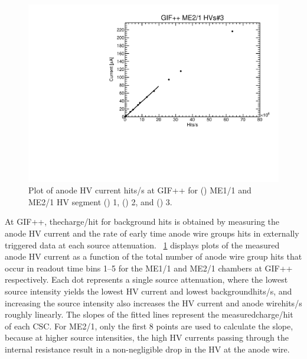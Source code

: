 \begin{figure}
	\includegraphics[width=\halfFigWidth]{figures/neutron/g_S3_C110.pdf}
	\caption{Plot of anode HV current \vs\unit{hits/s} at GIF++ for () ME1/1 and ME2/1 HV segment () 1, () 2, and () 3.}
	\label{fig:GIF_IvsH}
\end{figure}

At GIF++, the\unit{charge/hit} for background hits is obtained by measuring the anode HV current and the rate of early time anode wire groups hits in externally triggered data at each source attenuation. \Fig~\ref{fig:GIF_IvsH} displays plots of the measured anode HV current as a function of the total number of anode wire group hits that occur in readout time bins 1--5 for the ME1/1 and ME2/1 chambers at GIF++ respectively. Each dot represents a single source attenuation, where the lowest source intensity yields the lowest HV current and lowest background\unit{hits/s}, and increasing the source intensity also increases the HV current and anode wire\unit{hits/s} roughly linearly. The slopes of the fitted lines represent the measured\unit{charge/hit} of each CSC. For ME2/1, only the first 8 points are used to calculate the slope, because at higher source intensities, the high HV currents passing through the internal resistance result in a non-negligible drop in the HV at the anode wire.

